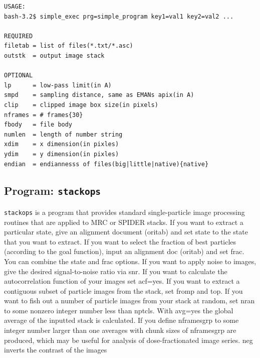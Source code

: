 \documentclass[a4paper,11pt]{article}
\newcommand{\prgname}[1]{\textcolor{NavyBlue}{\texttt{#1}}}
\begin{document}
\begin{verbatim}
USAGE:
bash-3.2$ simple_exec prg=simple_program key1=val1 key2=val2 ...

REQUIRED
filetab = list of files(*.txt/*.asc)
outstk  = output image stack

OPTIONAL
lp      = low-pass limit(in A)
smpd    = sampling distance, same as EMANs apix(in A)
clip    = clipped image box size(in pixels)
nframes = # frames{30}
fbody   = file body
numlen  = length of number string
xdim    = x dimension(in pixles)
ydim    = y dimension(in pixles)
endian  = endiannesss of files(big|little|native){native}
\end{verbatim}

\subsection{Program: \prgname{stackops}}
\label{stackops}
\prgname{stackops} is a program that provides standard single-particle image processing routines that are applied to MRC or SPIDER stacks. If you want to extract a particular state, give an alignment document (oritab) and set state to the state that you want to extract. If you want to select the fraction of best particles (according to the goal function), input an alignment doc (oritab) and set frac. You can combine the state and frac options. If you want to apply noise to images, give the desired signal-to-noise ratio via snr. If you want to calculate the autocorrelation function of your images set acf=yes. If you want to extract a contiguous subset of particle images from the stack, set fromp and top. If you want to fish out a number of particle images from your stack at random, set nran to some nonzero integer number less than nptcls. With avg=yes the global average of the inputted stack is calculated. If you define nframesgrp to some integer number larger than one averages with chunk sizes of nframesgrp are produced, which may be useful for analysis of dose-fractionated image series. neg inverts the contrast of the images
\end{document}
